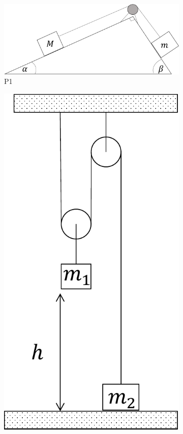 \documentclass[letterpaper,11pt]{article}
\begin{document}
\begin{enumerate}
\begin{figure}[h!]
    \centering
    \begin{subfigure}[t]{0.4\textwidth}
        \centering
        \includegraphics[width=0.8\linewidth]{2021-1/Imagenes/aux6/p1.pdf}
        \caption{P1}
        \label{fig:p1}
    \end{subfigure}
    \hspace{0.5em}
    \begin{subfigure}[t]{0.15\textwidth}
        \centering
        \includegraphics[width=0.85\linewidth]{2021-1/Imagenes/aux6/p2.pdf}

\end{subfigure}
\end{figure}
\end{enumerate}
\end{document}
